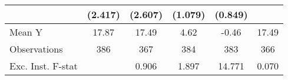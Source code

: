 {\begin{tabular}{l*{5}{c}}
            &     (2.417)         &     (2.607)         &     (1.079)         &     (0.849)         &                     \\
\midrule
Mean Y      &       17.87         &       17.49         &        4.62         &       -0.46         &       17.49         \\
Observations&         386         &         367         &         384         &         383         &         366         \\
Exc. Inst. F-stat&                     &       0.906         &       1.897         &      14.771         &       0.070         \\
\bottomrule
\end{tabular}
}
